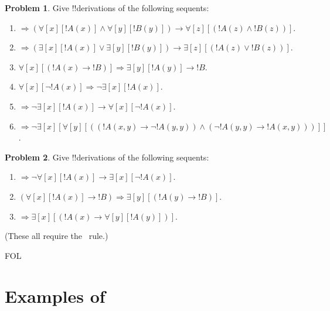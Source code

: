 \documentclass[10pt,a4paper]{article}
\theoremstyle{plain}
\theoremstyle{definition}
\newtheorem{prob}{Problem}[section]
\theoremstyle{remark}
\newcommand*{\olfileid}[3]{}
\newcommand*{\olsection}[1]{\section*{#1}}
\providecommand{\lif}{\mathbin{\rightarrow}}
\providecommand{\lforall}{\mathord{\forall}}
\providecommand{\lexists}{\mathord{\exists}}
\providecommand{\Sequent}{\mathrel{\Rightarrow}}
\providecommand{\iftag}[1]{#1}
\providecommand{\RightR}[1]{}
\providecommand{\RightR}{\mathrm{R}}
\begin{document}
\begin{prob}
Give !!{derivation}s of the following sequents:
\begin{enumerate}
\item $\Sequent (\lforall[x][!A(x)] \land \lforall[y][!B(y)]) \lif
\lforall[z][(!A(z) \land !B(z))]$.
\item $\Sequent (\lexists[x][!A(x)] \lor \lexists[y][!B(y)]) \lif
\lexists[z][(!A(z) \lor !B(z))]$.
\item $\lforall[x][(!A(x) \lif !B)] \Sequent \lexists[y][!A(y)] \lif !B$.
\item $\lforall[x][\lnot !A(x)] \Sequent \lnot\lexists[x][!A(x)]$.
\item $\Sequent \lnot\lexists[x][!A(x)] \lif \lforall[x][\lnot !A(x)]$.
\item $\Sequent \lnot\lexists[x][\lforall[y][((!A(x,y) \lif \lnot
!A(y,y)) \land (\lnot !A(y,y) \lif !A(x,y)))]]$.
\end{enumerate}
\end{prob}

\begin{prob}
Give !!{derivation}s of the following sequents:
\begin{enumerate}
\item $\Sequent \lnot\lforall[x][!A(x)] \lif \lexists[x][\lnot!A(x)]$.
\item $(\lforall[x][!A(x)] \lif !B) \Sequent \lexists[y][(!A(y) \lif !B)]$.
\item $\Sequent \lexists[x][(!A(x) \lif \lforall[y][!A(y)])]$.
\end{enumerate}
(These all require the $\RightR{\Contraction}$~rule.)
\end{prob}





\iftag{FOL}
      {\olfileid{fol}{seq}{pro}}
      {\olfileid{pl}{seq}{pro}}

\olsection{Examples of }
\end{document}
